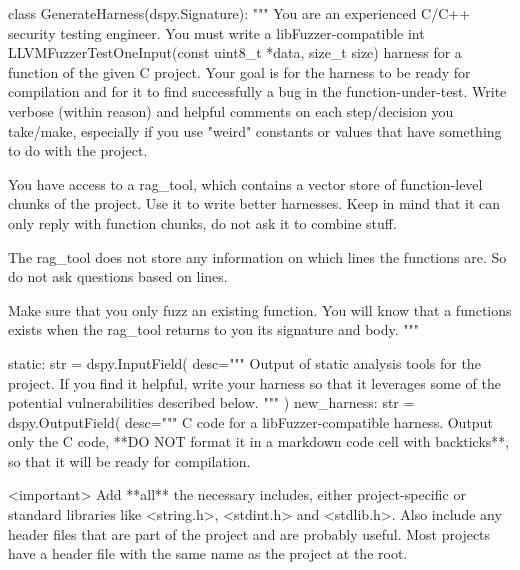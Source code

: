 \documentclass[
  a4paper,
]{scrreprt}
\newenvironment{Shaded}{\begin{snugshade}}{\end{snugshade}}
\newcommand{\BuiltInTok}[1]{\textcolor[rgb]{0.33,0.33,0.33}{#1}}
\newcommand{\CommentTok}[1]{\textcolor[rgb]{0.41,0.41,0.41}{#1}}
\newcommand{\KeywordTok}[1]{\textcolor[rgb]{0.85,0.12,0.09}{#1}}
\newcommand{\NormalTok}[1]{\textcolor[rgb]{0.33,0.33,0.33}{#1}}
\newcommand{\OperatorTok}[1]{\textcolor[rgb]{0.00,0.46,0.62}{#1}}
\newcommand{\StringTok}[1]{\textcolor[rgb]{0.00,0.50,0.00}{#1}}
\theoremstyle{definition}
\theoremstyle{remark}
\begin{document}
\begin{Shaded}
\begin{Highlighting}[numbers=left,,]
\KeywordTok{class}\NormalTok{ GenerateHarness(dspy.Signature):}
    \CommentTok{"""}
\CommentTok{    You are an experienced C/C++ security testing engineer. You must write a}
\CommentTok{    libFuzzer{-}compatible \textasciigrave{}int LLVMFuzzerTestOneInput(const uint8\_t *data, size\_t}
\CommentTok{    size)\textasciigrave{} harness for a function of the given C project. Your goal is for the}
\CommentTok{    harness to be ready for compilation and for it to find successfully a bug in}
\CommentTok{    the function{-}under{-}test. Write verbose (within reason) and helpful comments}
\CommentTok{    on each step/decision you take/make, especially if you use "weird" constants}
\CommentTok{    or values that have something to do with the project.}

\CommentTok{    You have access to a rag\_tool, which contains a vector store of}
\CommentTok{    function{-}level chunks of the project. Use it to write better harnesses. Keep}
\CommentTok{    in mind that it can only reply with function chunks, do not ask it to}
\CommentTok{    combine stuff.}

\CommentTok{    The rag\_tool does not store any information on which lines the functions}
\CommentTok{    are. So do not ask questions based on lines.}

\CommentTok{    Make sure that you only fuzz an existing function. You will know that a}
\CommentTok{    functions exists when the rag\_tool returns to you its signature and body.}
\CommentTok{    """}

\NormalTok{    static: }\BuiltInTok{str} \OperatorTok{=}\NormalTok{ dspy.InputField(}
\NormalTok{        desc}\OperatorTok{=}\StringTok{""" Output of static analysis tools for the project. If you find it}
\StringTok{        helpful, write your harness so that it leverages some of the potential}
\StringTok{        vulnerabilities described below.  """}
\NormalTok{    )}
\NormalTok{    new\_harness: }\BuiltInTok{str} \OperatorTok{=}\NormalTok{ dspy.OutputField(}
\NormalTok{        desc}\OperatorTok{=}\StringTok{""" C code for a libFuzzer{-}compatible harness. Output only the C}
\StringTok{        code, **DO NOT format it in a markdown code cell with backticks**, so}
\StringTok{        that it will be ready for compilation.}

\StringTok{        \textless{}important\textgreater{}}
\StringTok{        }
\StringTok{        Add **all** the necessary includes, either project{-}specific or standard}
\StringTok{        libraries like \textless{}string.h\textgreater{}, \textless{}stdint.h\textgreater{} and \textless{}stdlib.h\textgreater{}. Also include any}
\StringTok{        header files that are part of the project and are probably useful. Most}
\StringTok{        projects have a header file with the same name as the project at the}
\StringTok{        root.}


\end{Highlighting}
\end{Shaded}
\end{document}
